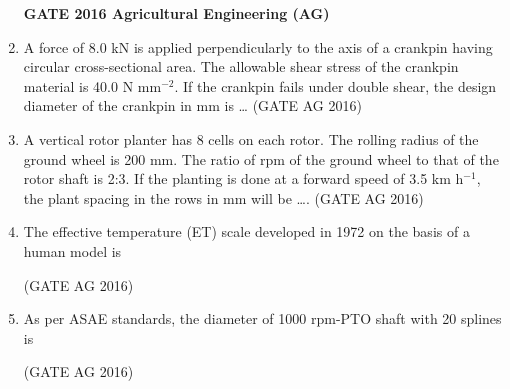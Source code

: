 \documentclass[journal]{IEEEtran}
\begin{document}
\begin{enumerate}
\medskip

\noindent
\textbf{GATE 2016 Agricultural Engineering (AG)}

\item 
A force of 8.0 kN is applied perpendicularly to the axis of a crankpin having circular cross-sectional area. The allowable shear stress of the crankpin material is 40.0 N mm$^{-2}$. If the crankpin fails under double shear, the design diameter of the crankpin in mm is \dots
\hfill(GATE AG 2016)\\

\medskip

\item 
A vertical rotor planter has 8 cells on each rotor. The rolling radius of the ground wheel is 200 mm. The ratio of rpm of the ground wheel to that of the rotor shaft is 2:3. If the planting is done at a forward speed of 3.5 km h$^{-1}$, the plant spacing in the rows in mm will be \dots.
\hfill(GATE AG 2016)\\

\medskip

\item 
The effective temperature (ET) scale developed in 1972 on the basis of a human model is
\begin{enumerate}
\end{enumerate}
\hfill(GATE AG 2016)\\

\medskip

\item 
As per ASAE standards, the diameter of 1000 rpm-PTO shaft with 20 splines is
\begin{enumerate}
\end{enumerate}
\hfill(GATE AG 2016)\\

\medskip


\end{enumerate}
\end{document}
